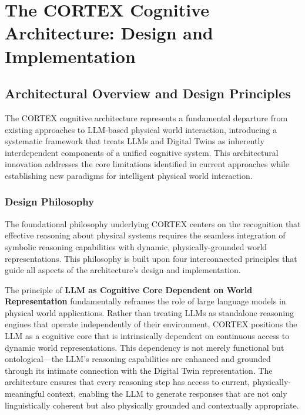
\chapter{The CORTEX Cognitive Architecture: Design and Implementation} \label{chp:cortex}


\section{Architectural Overview and Design Principles}

The CORTEX cognitive architecture represents a fundamental departure from existing approaches to LLM-based physical world interaction, introducing a systematic framework that treats LLMs and Digital Twins as inherently interdependent components of a unified cognitive system. This architectural innovation addresses the core limitations identified in current approaches while establishing new paradigms for intelligent physical world interaction.

\subsection{Design Philosophy}

The foundational philosophy underlying CORTEX centers on the recognition that effective reasoning about physical systems requires the seamless integration of symbolic reasoning capabilities with dynamic, physically-grounded world representations. This philosophy is built upon four interconnected principles that guide all aspects of the architecture's design and implementation.

The principle of \textbf{LLM as Cognitive Core Dependent on World Representation} fundamentally reframes the role of large language models in physical world applications. Rather than treating LLMs as standalone reasoning engines that operate independently of their environment, CORTEX positions the LLM as a cognitive core that is intrinsically dependent on continuous access to dynamic world representations. This dependency is not merely functional but ontological—the LLM's reasoning capabilities are enhanced and grounded through its intimate connection with the Digital Twin representation. The architecture ensures that every reasoning step has access to current, physically-meaningful context, enabling the LLM to generate responses that are not only linguistically coherent but also physically grounded and contextually appropriate.

